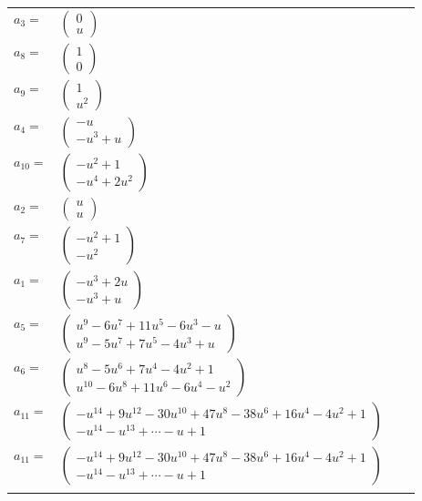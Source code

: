 \documentclass[1p]{elsarticle_modified}
\theoremstyle{definition}
\begin{document}
\begin{tabular}{m{7pt} m{180pt} m{7pt} m{180pt} }
\flushright $a_{3}=$&$\begin{pmatrix}0\\u\end{pmatrix}$ \\
\flushright $a_{8}=$&$\begin{pmatrix}1\\0\end{pmatrix}$ \\
\flushright $a_{9}=$&$\begin{pmatrix}1\\u^2\end{pmatrix}$ \\
\flushright $a_{4}=$&$\begin{pmatrix}- u\\- u^3+u\end{pmatrix}$ \\
\flushright $a_{10}=$&$\begin{pmatrix}- u^2+1\\- u^4+2 u^2\end{pmatrix}$ \\
\flushright $a_{2}=$&$\begin{pmatrix}u\\u\end{pmatrix}$ \\
\flushright $a_{7}=$&$\begin{pmatrix}- u^2+1\\- u^2\end{pmatrix}$ \\
\flushright $a_{1}=$&$\begin{pmatrix}- u^3+2 u\\- u^3+u\end{pmatrix}$ \\
\flushright $a_{5}=$&$\begin{pmatrix}u^9-6 u^7+11 u^5-6 u^3- u\\u^9-5 u^7+7 u^5-4 u^3+u\end{pmatrix}$ \\
\flushright $a_{6}=$&$\begin{pmatrix}u^8-5 u^6+7 u^4-4 u^2+1\\u^{10}-6 u^8+11 u^6-6 u^4- u^2\end{pmatrix}$ \\
\flushright $a_{11}=$&$\begin{pmatrix}- u^{14}+9 u^{12}-30 u^{10}+47 u^8-38 u^6+16 u^4-4 u^2+1\\- u^{14}- u^{13}+\cdots- u+1\end{pmatrix}$\\ \flushright $a_{11}=$&$\begin{pmatrix}- u^{14}+9 u^{12}-30 u^{10}+47 u^8-38 u^6+16 u^4-4 u^2+1\\- u^{14}- u^{13}+\cdots- u+1\end{pmatrix}$\\&\end{tabular}
\end{document}
